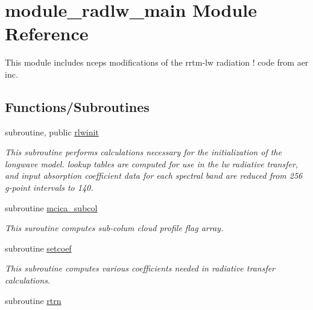 \hypertarget{namespacemodule__radlw__main}{}\section{module\+\_\+radlw\+\_\+main Module Reference}
\label{namespacemodule__radlw__main}


This module includes ncep\textquotesingle{}s modifications of the rrtm-\/lw radiation ! code from aer inc.  


\subsection*{Functions/\+Subroutines}
\begin{DoxyCompactItemize}
\item 
subroutine, public \hyperlink{namespacemodule__radlw__main_ad1f036ae760a7e9dcbbdd93492617bb3}{rlwinit}                                                                                             
\begin{DoxyCompactList}\small\item\em This subroutine performs calculations necessary for the initialization of the longwave model. lookup tables are computed for use in the lw radiative transfer, and input absorption coefficient data for each spectral band are reduced from 256 g-\/point intervals to 140. \end{DoxyCompactList}\item 
subroutine \hyperlink{namespacemodule__radlw__main_a6fd13528cd1e0335fb256c7f199e61bb}{mcica\+\_\+subcol}                                                                                   
\begin{DoxyCompactList}\small\item\em This suroutine computes sub-\/colum cloud profile flag array. \end{DoxyCompactList}\item 
subroutine \hyperlink{namespacemodule__radlw__main_a801f8ecd9281b8966caf536bebc5cc22}{setcoef}                                                                                             
\begin{DoxyCompactList}\small\item\em This subroutine computes various coefficients needed in radiative transfer calculations. \end{DoxyCompactList}\item 
subroutine \hyperlink{namespacemodule__radlw__main_a34aff059dd13272a3c45818ec40ba6d3}{rtrn}                                                                                                   

\end{DoxyCompactItemize}
